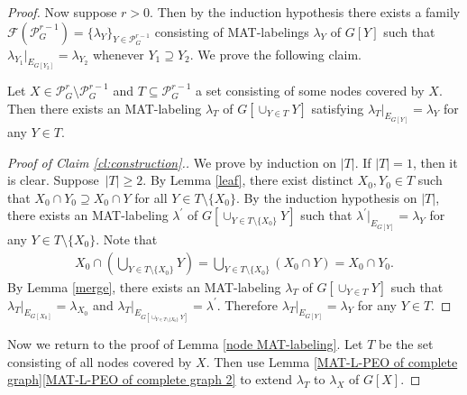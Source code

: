 \documentclass[ALCO, Unicode,published]{cedram}
\newcommand{\F}{\mathcal{F}}
\begin{document}
\begin{proof}
Now suppose $ r > 0 $.
Then by the induction hypothesis there exists a family $\F( \mathcal{P}_{G}^{r-1})= \{\lambda_{Y}\}_{Y \in \mathcal{P}_{G}^{r-1}} $ consisting of MAT-labelings $ \lambda_{Y} $ of $ G[Y] $ such that $ \lambda_{Y_{1}}|_{E_{G[Y_{2}]}} = \lambda_{Y_{2}} $ whenever $ Y_{1} \supseteq Y_{2} $. 
We prove the following claim.
\begin{claim} 
\label{cl:construction} 
 Let $ X \in \mathcal{P}_{G}^{r} \setminus \mathcal{P}_{G}^{r-1} $ and $ T \subseteq \mathcal{P}_{G}^{r-1} $ a set consisting of some nodes covered by $ X $. 
Then there exists an MAT-labeling $ \lambda_{T} $ of $ G[\cup_{Y \in T}Y] $ satisfying $ \lambda_{T}|_{E_{G[Y]}} = \lambda_{Y} $ for any $ Y \in T $.  
\end{claim}
\begin{proof}[Proof of Claim \ref{cl:construction}.]
We prove by induction on $ |T| $.
If $ |T| = 1 $, then it is clear. 
Suppose~$ |T| \geq 2 $. 
By Lemma \ref{leaf}, there exist distinct $ X_{0}, Y_{0} \in T $ such that $ X_{0} \cap Y_{0} \supseteq X_{0} \cap Y $ for all $ Y \in T \setminus \{X_{0}\} $. 
By the induction hypothesis on $ |T| $, there exists an MAT-labeling $ \lambda^{\prime} $ of $ G[\cup_{Y \in T\setminus\{X_{0}\}}Y] $ such that $ \lambda^{\prime}|_{E_{G[Y]}} = \lambda_{Y} $ for any $ Y \in T\setminus\{X_{0}\} $. 
Note that
\begin{align*}
X_{0} \cap \left(\bigcup_{Y \in T \setminus\{X_{0}\}}Y\right)
= \bigcup_{Y \in T \setminus\{X_{0}\}}(X_{0} \cap Y) = X_{0} \cap Y_{0}.
\end{align*}
By Lemma \ref{merge}, there exists an MAT-labeling $ \lambda_{T} $ of $ G[\cup_{Y \in T}Y] $ such that $ \lambda_{T}|_{E_{G[X_{0}]}} = \lambda_{X_{0}} $ and $ \lambda_{T}|_{E_{G[\cup_{Y \in T\setminus\{X_{0}\}}Y]}} = \lambda^{\prime} $. 
Therefore $ \lambda_{T}|_{E_{G[Y]}} = \lambda_{Y} $ for any $ Y \in T $. 
\end{proof}
Now we return to the proof of Lemma \ref{node MAT-labeling}. 
Let $ T $ be the set consisting of all nodes covered by $ X $. 
Then use Lemma \ref{MAT-L-PEO of complete graph}\ref{MAT-L-PEO of complete graph 2} to extend $ \lambda_{T} $ to $ \lambda_{X} $ of $ G[X] $. 
\end{proof}
\end{document}
